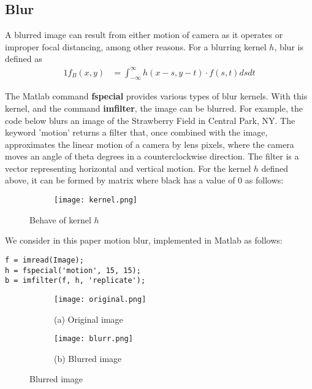 \documentclass[12pt]{report}
\begin{document}
\begin{tableofcontents}
			\section{Blur}
A blurred image can result from either motion of camera as it operates or improper focal distancing, among other reasons. For a blurring kernel $h$, blur is defined as
			\begin{alignat*}{1}
            f_{B}(x,y) &= \int_{-\infty}^{\infty} h(x-s, y-t)\cdot f(s,t)ds dt
            \end{alignat*}
\par
The Matlab command \textbf{fspecial} provides various types of blur kernels. With this kernel, and the command \textbf{imfilter}\cite{imfilter}, the image can be blurred. For example, the code below blurs an image of the Strawberry Field in Central Park, NY. The keyword 'motion' returns a filter that, once combined with the image, approximates the linear motion of a camera by lens pixels, where the camera moves an angle of theta degrees in a counterclockwise direction. The filter is a vector representing horizontal and vertical motion. For the kernel $h$ defined above, it can be formed by matrix where black has a value of 0 as follows:
			\begin{figure}[H]
				\centering
				\begin{subfigure}{0.7\textwidth}
					\texttt{[image: kernel.png]}
				\end{subfigure}
                \caption{Behave of kernel $h$}
			\end{figure}
\noindent
We consider in this paper motion blur, implemented in Matlab as follows:
\begin{lstlisting}
f = imread(Image);
h = fspecial('motion', 15, 15);
b = imfilter(f, h, 'replicate');
\end{lstlisting}
        	\begin{figure}[H]
				\centering
				\captionsetup[subfigure]{labelformat=empty}
				\begin{subfigure}{0.49\textwidth}
					\texttt{[image: original.png]}
					\caption{(a) Original image}
				\end{subfigure}
				\begin{subfigure}[h]{0.49\textwidth}
					\texttt{[image: blurr.png]}
					\caption{(b) Blurred image}
				\end{subfigure}
				\caption{Blurred image}
			\end{figure}



\end{tableofcontents}
\end{document}
